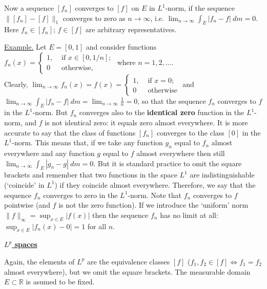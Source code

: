 \documentclass[a4paper,10pt]{article}
\def\RR{\mathbb{R}}
\newcommand{\1}[1]{\mathbf{1}_{\{#1\}}}
\begin{document}
Now a sequence $[f_n]$ converges to $[f]$ on $E$ in $L^1$-norm, if  the sequence $\|[f_n]-[f]\|_1$ converges to zero as $n\to\infty$, i.e. $\lim_{n\to\infty} \int_E |f_n-f|~dm=0$. Here $f_n\in[f_n]$; $f\in[f]$ are arbitrary representatives. \vspace{3mm}

\underline{Example.} Let $E=[0,1]$ and consider functions \\ $f_n(x)=\left\{\begin{array}{ll} 1, & \mbox{ if } x\in[0,1/n]; \\ 0 & \mbox{ otherwise}, \end{array}\right.$ where $n=1,2,\ldots$.\\ Clearly,
$\lim_{n\to\infty} f_n(x)=f(x)=\left\{\begin{array}{ll} 1, & \mbox{ if } x=0; \\ 0 & \mbox{ otherwise} \end{array}\right.$ and $\lim_{n\to\infty} \int_E |f_n-f|~dm=\lim_{n\to\infty} \frac{1}{n}=0$, so that the sequence $f_n$ converges to $f$ in the $L^1$-norm. But $f_n$ converges also to the {\bf identical zero} function in the $L^1$-norm, and $f$ is not identical zero: it equals zero almost everywhere. It is more accurate to say that the class of functions $[f_n]$ converges to the class $[0]$ in the $L^1$-norm. This means that, if we take any function $g_n$ equal to $f_n$ almost everywhere and any function $g$ equal to $f$ almost everywhere then still $\lim_{n\to\infty} \int_E |g_n-g|~dm=0$.
But it is standard practice to omit the square brackets and remember that two functions in the space $L^1$ are indistinguishable (`coincide' in $L^1$) if they coincide almost everywhere. Therefore, we say that the sequence $f_n$ converges to zero in the $L^1$-norm. Note that $f_n$ converges to $f$ pointwise (and $f$ is not the zero function). If we introduce the `uniform' norm $\|f\|_\infty=\sup_{x\in E} |f(x)|$ then the sequence $f_n$ has no limit at all: $\sup_{x\in E} |f_n(x)-0|=1$ for all $n$.\vspace{3mm}

\begin{center}\bf\underline{$L^p$ spaces} \end{center}\vspace{3mm}

Again, the elements of $L^p$ are the equivalence classes $[f]$ ($f_1,f_2\in[f] \Longleftrightarrow f_1=f_2$ almost everywhere), but we omit the square brackets. The measurable domain $E\subset\RR$ is asumed to be fixed.\vspace{3mm}
\end{document}
